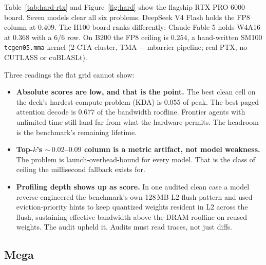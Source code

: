 \documentclass[11pt]{article}
\begin{document}
Table~\ref{tab:hard-rtx} and Figure~\ref{fig:hard} show the flagship RTX PRO 6000 board. Seven models clear all six problems. DeepSeek V4 Flash holds the FP8 column at $0.409$. The H100 board ranks differently: Claude Fable 5 holds W4A16 at $0.368$ with a 6/6 row. On B200 the FP8 ceiling is $0.254$, a hand-written SM100 \texttt{tcgen05.mma} kernel (2-CTA cluster, TMA + mbarrier pipeline; real PTX, no CUTLASS or cuBLASLt).

Three readings the flat grid cannot show:

\begin{itemize}
\item \textbf{Absolute scores are low, and that is the point.} The best clean cell on the deck's hardest compute problem (KDA) is $0.055$ of peak. The best paged-attention decode is $0.677$ of the bandwidth roofline. Frontier agents with unlimited time still land far from what the hardware permits. The headroom is the benchmark's remaining lifetime.
\item \textbf{Top-$k$'s ${\sim}\,0.02$--$0.09$ column is a metric artifact, not model weakness.} The problem is launch-overhead-bound for every model. That is the class of ceiling the millisecond fallback exists for.
\item \textbf{Profiling depth shows up as score.} In one audited clean case a model reverse-engineered the benchmark's own 128\,MB L2-flush pattern and used eviction-priority hints to keep quantized weights resident in L2 across the flush, sustaining effective bandwidth above the DRAM roofline on reused weights. The audit upheld it. Audits must read traces, not just diffs.
\end{itemize}

\subsection{Mega}
\end{document}
